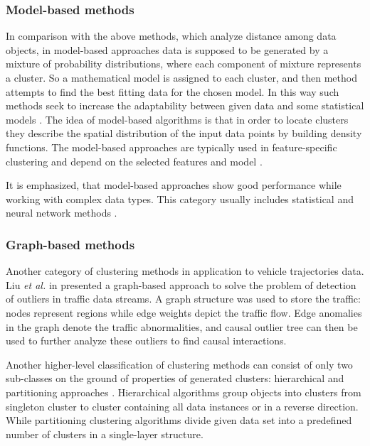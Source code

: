 \subsubsection{Model-based methods}
In comparison with the above methods, which analyze distance among data objects, in model-based approaches data is supposed to be generated by a mixture of probability distributions, where each component of mixture represents a cluster. So a mathematical model is assigned to each cluster, and then method attempts to find the best fitting data for the chosen model. In this way such methods seek to increase the adaptability between given data and some statistical models \cite{article:8_review_mot_cl_alg}\cite{article:22_survey_dscc}. The idea of model-based algorithms is that in order to locate clusters they describe the spatial distribution of the input data points by building density functions. The model-based approaches are typically used in feature-specific clustering and depend on the selected features and model \cite{article:5_survey_tbsa}.

It is emphasized, that model-based approaches show good performance while working with complex data types. This category usually includes statistical and neural network methods \cite{article:8_review_mot_cl_alg}.

\subsubsection{Graph-based methods \cite{article:1_survey_stdm}}
Another category of clustering methods in application to vehicle trajectories data. Liu \textit{et al.} in \cite{inproceedings:26_dstci_tds} presented a graph-based approach to solve the problem of detection of outliers in traffic data streams. A graph structure was used to store the traffic: nodes represent regions while edge weights depict the traffic flow. Edge anomalies in the graph denote the traffic abnormalities, and causal outlier tree can then be used to further analyze these outliers to find causal interactions.

\bigbreak
Another higher-level classification of clustering methods can consist of only two sub-classes on the ground of properties of generated clusters: hierarchical and partitioning approaches \cite{article:23_survey_ca}. Hierarchical algorithms group objects into clusters from singleton cluster to cluster containing all data instances or in a reverse direction. While partitioning clustering algorithms divide given data set into a predefined number of clusters in a single-layer structure.

